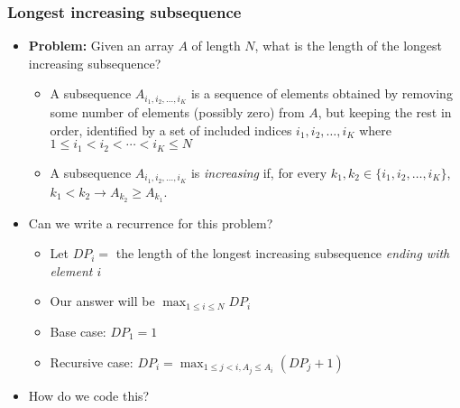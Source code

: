 \documentclass[t]{beamer}
\begin{document}
\begin{frame}

    \frametitle{Longest increasing subsequence}

    \begin{itemize}

        \item

        \textbf{Problem:} Given an array $A$ of length $N$, what is the length of the longest increasing subsequence?

        \begin{itemize}

            \item

            A subsequence $A_{i_1, i_2, \dots, i_K}$ is a sequence of elements obtained by removing some number of elements (possibly zero) from $A$, but keeping the rest in order, identified by a set of included indices $i_1, i_2, \dots, i_K$ where $1 \leq i_1 < i_2 < \cdots < i_K \leq N$

            \item

            A subsequence $A_{i_1, i_2, \dots, i_K}$ is \textit{increasing} if, for every $k_1, k_2 \in \{i_1, i_2, \dots, i_K\}$, $k_1 < k_2 \rightarrow A_{k_2} \geq A_{k_1}$.

        \end{itemize}

        \pause

        \item

        Can we write a recurrence for this problem?

        \pause

        \begin{itemize}

            \item

            Let $DP_i = $ the length of the longest increasing subsequence \textit{ending with element $i$}

            \pause

            \item

            Our answer will be $\max_{1 \leq i \leq N} DP_i$

            \pause

            \item

            Base case: $DP_1 = 1$

            \item

            Recursive case: $DP_i = \max_{1 \leq j < i, A_j \leq A_i} (DP_j + 1)$

        \end{itemize}

        \pause

        \item

        How do we code this?

    \end{itemize}

\end{frame}
\end{document}
